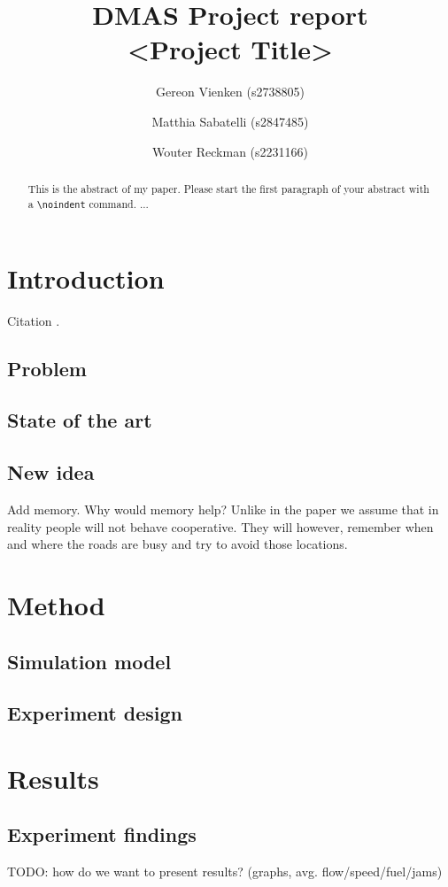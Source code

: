 \documentclass[a4paper,hidelinks]{article}
\title{\textbf{\huge DMAS Project report\\ <Project Title>}%
}
\author{Gereon Vienken (s2738805) \and
    Matthia Sabatelli (s2847485) \and
    Wouter Reckman (s2231166)
}
\date{}
\begin{document}
\ttl
\thispagestyle{empty}

%


\begin{abstract}
\noindent
This is the abstract of my paper. Please start the first paragraph of your abstract with a \verb+\noindent+ command.
...
\end{abstract}


\section{Introduction}
Citation \cite{gabel2012cooperative}.

\subsection{Problem}
\subsection{State of the art}
\subsection{New idea}
Add memory. Why would memory help? Unlike in the paper we assume that in reality people will not behave cooperative. They will however, remember when and where the roads are busy and try to avoid those locations.


\section{Method}
\subsection{Simulation model}
\subsection{Experiment design}


\section{Results}
\subsection{Experiment findings}
TODO: how do we want to present results? (graphs, avg. flow/speed/fuel/jams)
\end{document}

